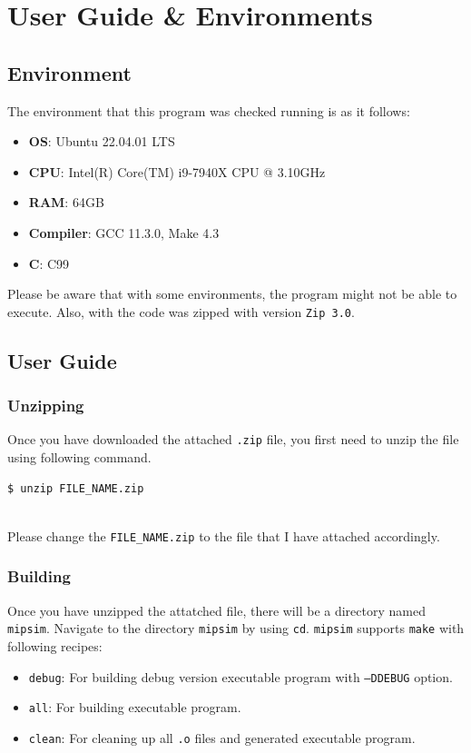 \documentclass{homework}
\begin{document}
\section{User Guide & Environments}
\subsection{Environment}
The environment that this program was checked running is as it follows:
\begin{itemize}
    \item \textbf{OS}: Ubuntu 22.04.01 LTS
    \item \textbf{CPU}: Intel(R) Core(TM) i9-7940X CPU @ 3.10GHz
    \item \textbf{RAM}: 64GB
    \item \textbf{Compiler}: GCC 11.3.0, Make 4.3
    \item \textbf{C}: C99
\end{itemize}

Please be aware that with some environments, the program might not be able to execute. Also, with the code was zipped with version \texttt{Zip 3.0}. 

\subsection{User Guide}
\subsubsection{Unzipping}
Once you have downloaded the attached \texttt{.zip} file, you first need to unzip the file using following command.
\\
\begin{center}
\begin{code}
\begin{verbatim}
$ unzip FILE_NAME.zip
\end{verbatim}
\end{code}
\end{center}
\\
Please change the \texttt{FILE_NAME.zip} to the file that I have attached accordingly.

\subsubsection{Building}
Once you have unzipped the attatched file, there will be a directory named \texttt{mipsim}. Navigate to the directory \texttt{mipsim} by using \texttt{cd}. \texttt{mipsim} supports \texttt{make} with following recipes:
\begin{itemize}
    \item \texttt{debug}: For building debug version executable program with \texttt{--DDEBUG} option.
    \item \texttt{all}: For building executable program.
    \item \texttt{clean}: For cleaning up all \texttt{.o} files and generated executable program.
\end{itemize}
\end{document}
